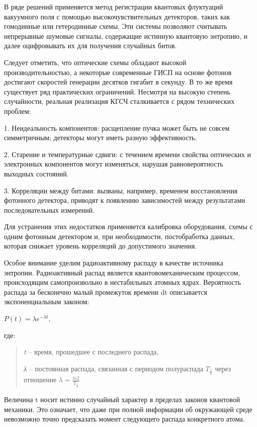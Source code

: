 В ряде решений применяется метод регистрации квантовых флуктуаций
вакуумного поля с помощью высокочувствительных детекторов, таких как
гомодинные или гетеродинные схемы. Эти системы позволяют считывать
непрерывные шумовые сигналы, содержащие истинную квантовую энтропию, и
далее оцифровывать их для получения случайных битов.

Следует отметить, что оптические схемы обладают высокой
производительностью, а некоторые современные ГИСП на основе фотонов
достигают скоростей генерации десятков гигабит в секунду. В то же время
существует ряд практических ограничений. Несмотря на высокую степень
случайности, реальная реализация КГСЧ сталкивается с рядом технических
проблем:

1. Неидеальность компонентов: расщепление пучка может быть не совсем
симметричным; детекторы могут иметь разную эффективность.

2. Старение и температурные сдвиги: с течением времени свойства
оптических и электронных компонентов могут изменяться, нарушая
равновероятность выходных состояний.

3. Корреляции между битами: вызваны, например, временем восстановления
фотонного детектора, приводят к появлению зависимостей между
результатами последовательных измерений.

Для устранения этих недостатков применяется калибровка оборудования,
схемы с одним фотонным детектором и, при необходимости, постобработка
данных, которая снижает уровень корреляций до допустимого значения.

Особое внимание уделим радиоактивному распаду в качестве источника
энтропии. Радиоактивный распад является квантовомеханическим процессом,
происходящим самопроизвольно в нестабильных атомных ядрах. Вероятность
распада за бесконечно малый промежуток времени dt описывается
экспоненциальным законом:

\(P(t) = \lambda e^{- \lambda t}\),

где:

\begin{quote}
\emph{t} -- время, прошедшее с последнего распада,

\emph{λ} -- постоянная распада, связанная с периодом полураспада
\(T_{\frac{1}{2}}\)\hspace{0pt} через отношение
\(\lambda = \frac{ln2}{T_{\frac{1}{2}}}\)
\end{quote}

Величина t носит истинно случайный характер в пределах законов квантовой
механики. Это означает, что даже при полной информации об окружающей
среде невозможно точно предсказать момент следующего распада конкретного
атома.

